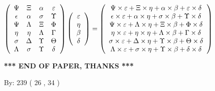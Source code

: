 \documentclass[12pt]{article}
\begin{document}
$  %
 \left( \begin{array}
 {
 c
 c
 c
 c
 }
 \Psi & 
                    \Xi & 
 \alpha & 
 \varepsilon \\ 
 \epsilon & 
 \alpha & 
 \sigma & 
 \Upsilon \\ 
 \Psi & 
 \Lambda & 
                    \Xi & 
 \Phi \\ 
 \eta & 
 \eta & 
 \Lambda & 
 \Gamma \\ 
 \sigma & 
 \Delta & 
 \Upsilon & 
 \Theta \\ 
 \Lambda & 
 \sigma & 
 \Upsilon & 
 \delta
 \end{array} \right)
 \left( \begin{array}
 {
 c
 }
 \varepsilon \\ 
 \eta \\ 
 \beta \\ 
 \delta
 \end{array} \right)
=
 \left( \begin{array}
 {
 c
 }
  \Psi \times  \varepsilon +                     \Xi \times  \eta +  \alpha \times  \beta +  \varepsilon \times  \delta \\ 
  \epsilon \times  \varepsilon +  \alpha \times  \eta +  \sigma \times  \beta +  \Upsilon \times  \delta \\ 
  \Psi \times  \varepsilon +  \Lambda \times  \eta +                     \Xi \times  \beta +  \Phi \times  \delta \\ 
  \eta \times  \varepsilon +  \eta \times  \eta +  \Lambda \times  \beta +  \Gamma \times  \delta \\ 
  \sigma \times  \varepsilon +  \Delta \times  \eta +  \Upsilon \times  \beta +  \Theta \times  \delta \\ 
  \Lambda \times  \varepsilon +  \sigma \times  \eta +  \Upsilon \times  \beta +  \delta \times  \delta
 \end{array} \right)
$
 
 
 
   
   
 \vspace{0.2in}
 
   
   
   
   
\vspace{1.0in} 
{\textbf{\large{ *** END OF PAPER, THANKS *** }}} 
   
   
\hspace{1.0in} By: 
         239 (          26 ,           34 )
   
   
   
\end{document}
